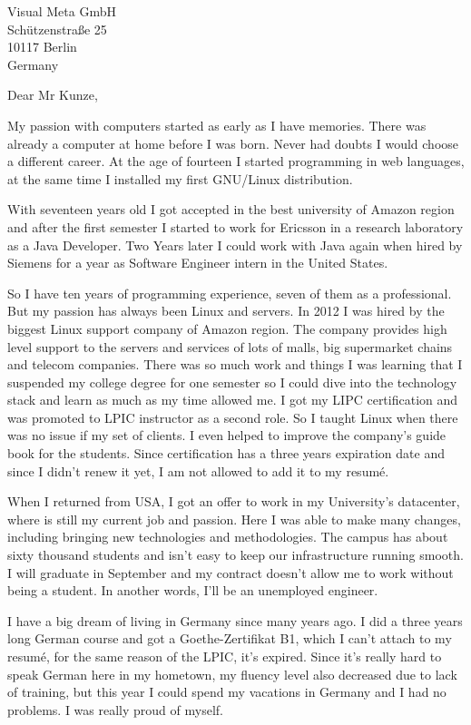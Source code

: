 \documentclass[a4paper]{letter}
\begin{document}
\begin{letter}{Visual Meta GmbH\\Schützenstraße 25\\10117 Berlin\\Germany}
\opening{Dear Mr Kunze,}
My passion with computers started as early as I have memories. There was already
a computer at home before I was born. Never had doubts I would choose a
different career. At the age of fourteen I started programming in web languages,
at the same time I installed my first GNU/Linux distribution.

With seventeen years old I got accepted in the best university of Amazon region
and after the first semester I started to work for Ericsson in a research
laboratory as a Java Developer. Two Years later I could work with Java again
when hired by Siemens for a year as Software Engineer intern in the United
States.

So I have ten years of programming experience, seven of them as a professional.
But my passion has always been Linux and servers. In 2012 I was hired by the
biggest Linux support company of Amazon region. The company provides high level
support to the servers and services of lots of malls, big supermarket chains and
telecom companies. There was so much work and things I was learning that I
suspended my college degree for one semester so I could dive into the technology
stack and learn as much as my time allowed me. I got my LIPC certification and
was promoted to LPIC instructor as a second role. So I taught Linux when there
was no issue if my set of clients. I even helped to improve the company's guide
book for the students. Since certification has a three years expiration date and
since I didn't renew it yet, I am not allowed to add it to my resumé.

When I returned from USA, I got an offer to work in my University's datacenter,
where is still my current job and passion. Here I was able to make many changes,
including bringing new technologies and methodologies. The campus has about
sixty thousand students and isn't easy to keep our infrastructure running
smooth. I will graduate in September and my contract doesn't allow me to work
without being a student. In another words, I'll be an unemployed engineer.

I have a big dream of living in Germany since many years ago. I did a three
years long German course and got a Goethe-Zertifikat B1, which I can't attach to
my resumé, for the same reason of the LPIC, it's expired. Since it's really hard
to speak German here in my hometown, my fluency level also decreased due to lack
of training, but this year I could spend my vacations in Germany and I had no
problems. I was really proud of myself.


\end{letter}
\end{document}
